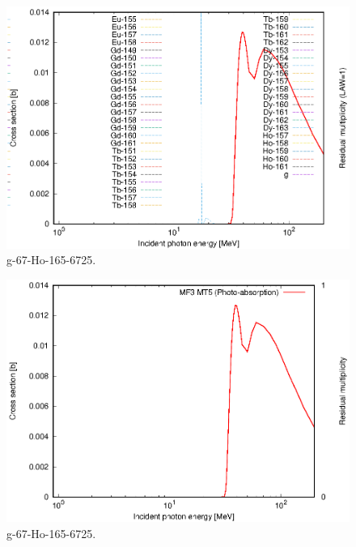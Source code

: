 \begin{figure}
 \includegraphics[width=\linewidth]{eps/g_67-Ho-165_6725.eps}
  \caption{g-67-Ho-165-6725.}
\end{figure}
\begin{figure}
 \includegraphics[width=\linewidth]{eps-law0/g_67-Ho-165_6725.eps}
 \caption{g-67-Ho-165-6725.}
\end{figure}
\newpage \clearpage

